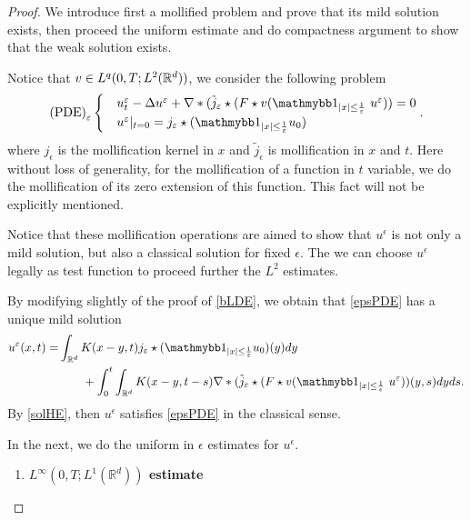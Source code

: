 \begin{proof}
We introduce first a mollified problem and prove that its mild solution exists, then proceed the uniform estimate and do compactness argument to show that the weak solution exists.

Notice that $v \in  L^{q}(0,T;L^{2}(\mathbb{R}^d) )$, we consider the following problem 
 \begin{align}\label{epsPDE}
   \text{(PDE)}_{\epsilon}\begin{cases}
    &u_t^{\epsilon} - \Delta u^{\epsilon}  + \nabla*(\tilde j_{\epsilon}\star (F \star  v (\cha_{\abs{x}\le \frac{1}{\epsilon}} \ u^{\epsilon})) = 0\\
    &u^{\epsilon}  \rvert_{t=0} = {j}_{\epsilon} \star (\cha_{\abs{x}\le \frac{1}{\epsilon}}  u_{0} )
  \end{cases}
 .\end{align}
where  $j_{\epsilon}$ is the mollification kernel in $x$ and $\tilde{j}_{\epsilon} $ is mollification in $x$ and $t$. Here without loss of generality, for the mollification of a function in $t$ variable, we do the mollification of its zero extension of this function. This fact will not be explicitly mentioned.

Notice that these mollification operations are aimed to show that $u^\epsilon$ is not only a mild solution, but also a classical solution for fixed $\epsilon$. The we can choose $u^\epsilon$ legally as test function to proceed further the $L^2$ estimates.

By modifying slightly of the proof of \autoref{bLDE}, we obtain that \autoref{epsPDE} has a unique mild solution
 \begin{align}\label{ueps}
   u^{\epsilon}(x,t) = &\int_{\mathbb{R}^{d} } K(x-y,t)j_{\epsilon} \star (\cha_{\abs{x}\le \frac{1}{\epsilon}}  u_{0} )(y) dy \\
   &\qquad+ \int_0^{t}  \int_{\mathbb{R}^{d} } K(x-y,t-s) \nabla*(\tilde j_{\epsilon}\star (F \star  v (\cha_{\abs{x}\le \frac{1}{\epsilon}} \ u^{\epsilon})) (y,s) dy ds\nonumber
 .\end{align}
By \autoref{solHE}, then $u^{\epsilon} $ satisfies \autoref{epsPDE} in the classical sense.

\vskip3mm
In the next, we do the uniform in $\epsilon$ estimates for $u^\epsilon$.
\begin{enumerate}
\item {\bf $L^{\infty}(0,T;L^{1}(\mathbb{R}^{d} ) ) $ estimate}


\end{enumerate}
\end{proof}
